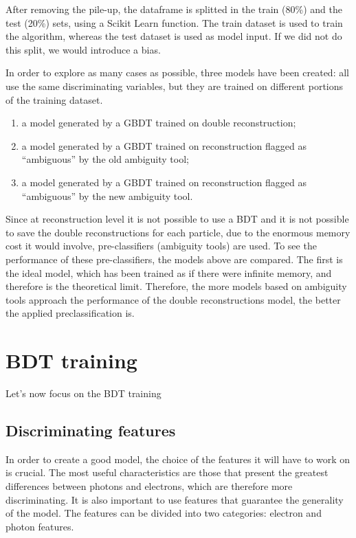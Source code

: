 \documentclass[a4paper, oneside]{book}
\begin{document}
		After removing the pile-up, the dataframe is splitted in the train (80\%) and the test (20\%) sets, using a Scikit Learn \cite{SKlearn} function. The train dataset is used to train the algorithm, whereas the test dataset is used as model input. If we did not do this split, we would introduce a bias.
		
		In order to explore as many cases as possible, three models have been created: all use the same discriminating variables, but they are trained on different portions of the training dataset.
		\begin{enumerate}
			\item a model generated by a GBDT trained on double reconstruction;
			\item a model generated by a GBDT trained on reconstruction flagged as “ambiguous” by the old ambiguity tool;
			\item a model generated by a GBDT trained on reconstruction flagged as “ambiguous” by the new ambiguity tool.
		\end{enumerate}
		
		Since at reconstruction level it is not possible to use a BDT and it is not possible to save the double reconstructions for each particle, due to the enormous memory cost it would involve, pre-classifiers (ambiguity tools) are used. To see the performance of these pre-classifiers, the models above are compared. The first is the ideal model, which has been trained as if there were infinite memory, and therefore is the theoretical limit. Therefore, the more models based on ambiguity tools approach the performance of the double reconstructions model, the better the applied preclassification is.
		
		\section{BDT training}
			Let's now focus on the BDT training
			\subsection{Discriminating features}
				In order to create a good model, the choice of the features it will have to work on is crucial. The most useful characteristics are those that present the greatest differences between photons and electrons, which are therefore more discriminating. It is also important to use features that guarantee the generality of the model. The features can be divided into two categories: electron and photon features.
\end{document}
